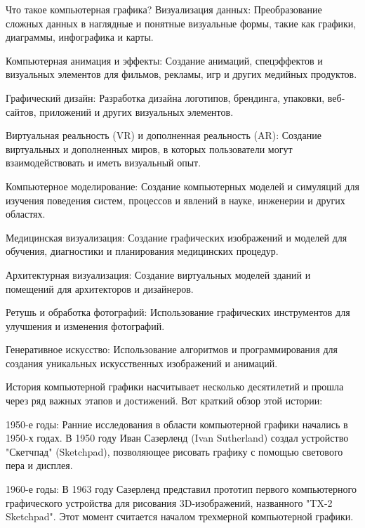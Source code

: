 \documentclass{beamer}
\begin{document}
\begin{frame}{Что такое компьютерная графика?}
		Визуализация данных: Преобразование сложных данных в наглядные и понятные визуальные формы, такие как графики, диаграммы, инфографика и карты.
		
		Компьютерная анимация и эффекты: Создание анимаций, спецэффектов и визуальных элементов для фильмов, рекламы, игр и других медийных продуктов.
		
		Графический дизайн: Разработка дизайна логотипов, брендинга, упаковки, веб-сайтов, приложений и других визуальных элементов.
		
		Виртуальная реальность (VR) и дополненная реальность (AR): Создание виртуальных и дополненных миров, в которых пользователи могут взаимодействовать и иметь визуальный опыт.
		
		Компьютерное моделирование: Создание компьютерных моделей и симуляций для изучения поведения систем, процессов и явлений в науке, инженерии и других областях.
		
		Медицинская визуализация: Создание графических изображений и моделей для обучения, диагностики и планирования медицинских процедур.
		
		Архитектурная визуализация: Создание виртуальных моделей зданий и помещений для архитекторов и дизайнеров.
		
		Ретушь и обработка фотографий: Использование графических инструментов для улучшения и изменения фотографий.
		
		Генеративное искусство: Использование алгоритмов и программирования для создания уникальных искусственных изображений и анимаций.
		\fi
		
	\end{frame}
	
	История компьютерной графики насчитывает несколько десятилетий и прошла через ряд важных этапов и достижений. Вот краткий обзор этой истории:
	
	1950-е годы: Ранние исследования в области компьютерной графики начались в 1950-х годах. В 1950 году Иван Сазерленд (Ivan Sutherland) создал устройство "Скетчпад" (Sketchpad), позволяющее рисовать графику с помощью светового пера и дисплея.
	
	1960-е годы: В 1963 году Сазерленд представил прототип первого компьютерного графического устройства для рисования 3D-изображений, названного "TX-2 Sketchpad". Этот момент считается началом трехмерной компьютерной графики.
	
\end{document}
